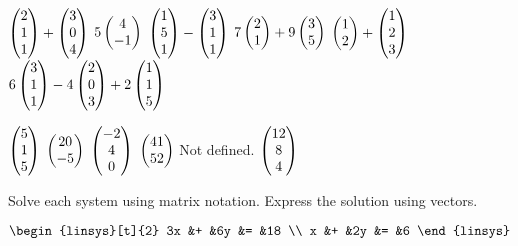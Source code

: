 \begin{exercises}
\begin{exparts*}
      \partsitem \( \begin{pmatrix} 2 \\ 1 \\ 1 \end{pmatrix}
               +\begin{pmatrix} 3 \\ 0 \\ 4 \end{pmatrix} \)
      \partsitem \( 5\begin{pmatrix} 4 \\ -1 \end{pmatrix} \)
      \partsitem \( \begin{pmatrix} 1 \\ 5 \\ 1 \end{pmatrix}
               -\begin{pmatrix} 3 \\ 1 \\ 1 \end{pmatrix} \)
      \partsitem \( 7\begin{pmatrix} 2 \\ 1 \end{pmatrix}
               +9\begin{pmatrix} 3 \\ 5 \end{pmatrix} \)
      \partsitem \( \begin{pmatrix} 1 \\ 2 \end{pmatrix}
               +\begin{pmatrix} 1 \\ 2 \\ 3 \end{pmatrix} \)
      \partsitem \( 6\begin{pmatrix} 3 \\ 1 \\ 1 \end{pmatrix}
               -4\begin{pmatrix} 2 \\ 0 \\ 3 \end{pmatrix}
               +2\begin{pmatrix} 1 \\ 1 \\ 5 \end{pmatrix} \)
    \end{exparts*}
    \begin{answer}
      \begin{exparts*}
        \partsitem \( \begin{pmatrix} 5 \\ 1 \\ 5 \end{pmatrix} \)
        \partsitem \( \begin{pmatrix} 20 \\ -5 \end{pmatrix} \)
        \partsitem \( \begin{pmatrix} -2 \\ 4 \\ 0 \end{pmatrix} \)
        \partsitem \( \begin{pmatrix} 41 \\ 52 \end{pmatrix} \)
        \partsitem Not defined.
        \partsitem \( \begin{pmatrix} 12 \\ 8 \\ 4 \end{pmatrix} \)
      \end{exparts*}  
     \end{answer}
  \recommended \item 
    Solve each system using matrix notation.
    Express the solution using vectors.
    \begin{exparts*}
      \partsitem \( \begin{linsys}[t]{2}
                  3x  &+  &6y  &=  &18  \\
                   x  &+  &2y  &=  &6   
                   \end{linsys}  \)

\end{exparts*}
\end{exercises}
